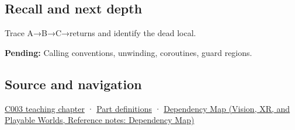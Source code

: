 \subsection{Recall and next depth}\label{appendix-b081b7abe193-recall-and-next-depth}

Trace A→B→C→returns and identify the dead local.

\textbf{Pending:} Calling conventions, unwinding, coroutines, guard regions.

\subsection{Source and navigation}\label{appendix-b081b7abe193-source-and-navigation}

\hyperref[01-foundations-i-ch002-where-the-bytes-live]{C003 teaching chapter} · \hyperref[appendix-fd090d982a15-m003---parts-41-60]{Part definitions} · \href{../07-Vision-XR-and-Playable-Worlds/main.pdf\#nameddest=appendix-4ad47bdd269a}{Dependency Map (Vision, XR, and Playable Worlds, Reference notes: Dependency Map)}

